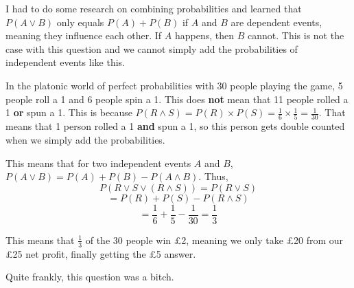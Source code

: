 \documentclass[a4paper]{article}
\newcommand{\oo}[1]{\frac{1}{#1}}
\begin{document}
I had to do some research on combining probabilities and learned that $P(A \vee B)$ only equals $P(A) + P(B)$ if $A$ and $B$ are dependent events, meaning they influence each other. If $A$ happens, then $B$ cannot. This is not the case with this question and we cannot simply add the probabilities of independent events like this.

In the platonic world of perfect probabilities with 30 people playing the game, 5 people roll a 1 and 6 people spin a 1. This does \textbf{not} mean that 11 people rolled a 1 \textbf{or} spun a 1. This is because $P(R \wedge S) = P(R) \times P(S) = \oo{6} \times \oo{5} = \oo{30}$. That means that 1 person rolled a 1 \textbf{and} spun a 1, so this person gets double counted when we simply add the probabilities.

\newpage

This means that for two independent events $A$ and $B$, $P(A \vee B) = P(A) + P(B) - P(A \wedge B)$. Thus, $$P(R \vee S \vee (R \wedge S)) = P(R \vee S)$$
$$= P(R) + P(S) - P(R \wedge S)$$
$$= \oo{6} + \oo{5} - \oo{30} = \oo{3}$$

This means that $\oo{3}$ of the 30 people win £2, meaning we only take £20 from our £25 net profit, finally getting the £5 answer.

Quite frankly, this question was a bitch.
\end{document}
